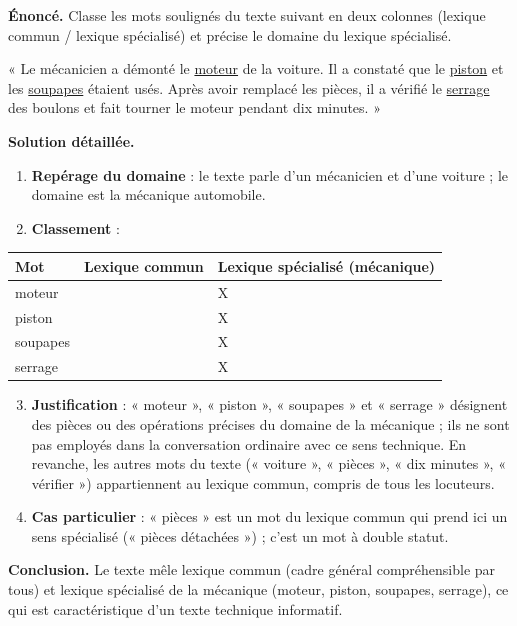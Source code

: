 \documentclass[11pt]{article}
\newcommand{\cle}[1]{{\popxbold\color{popdark}#1}}
\begin{document}
\begin{exoresolu}
\textbf{Énoncé.} Classe les mots soulignés du texte suivant en deux colonnes (lexique commun / lexique spécialisé) et précise le domaine du lexique spécialisé.

« Le mécanicien a démonté le \underline{moteur} de la voiture. Il a constaté que le \underline{piston} et les \underline{soupapes} étaient usés. Après avoir remplacé les pièces, il a vérifié le \underline{serrage} des boulons et fait tourner le moteur pendant dix minutes. »

\tcblower
\textbf{Solution détaillée.}
\begin{enumerate}
\item \textbf{Repérage du domaine} : le texte parle d'un mécanicien et d'une voiture ; le domaine est la \cle{mécanique automobile}.
\item \textbf{Classement} :
\end{enumerate}
\begin{center}
\begin{tabularx}{\linewidth}{|l|X|X|}\hline
\rowcolor{popblueL} \textbf{Mot} & \textbf{Lexique commun} & \textbf{Lexique spécialisé (mécanique)} \\ \hline
moteur & & X \\ \hline
piston & & X \\ \hline
soupapes & & X \\ \hline
serrage & & X \\ \hline
\end{tabularx}
\end{center}
\begin{enumerate}
\setcounter{enumi}{2}
\item \textbf{Justification} : « moteur », « piston », « soupapes » et « serrage » désignent des pièces ou des opérations précises du domaine de la mécanique ; ils ne sont pas employés dans la conversation ordinaire avec ce sens technique. En revanche, les autres mots du texte (« voiture », « pièces », « dix minutes », « vérifier ») appartiennent au lexique commun, compris de tous les locuteurs.
\item \textbf{Cas particulier} : « pièces » est un mot du lexique commun qui prend ici un sens spécialisé (« pièces détachées ») ; c'est un mot à double statut.
\end{enumerate}
\textbf{Conclusion.} Le texte mêle lexique commun (cadre général compréhensible par tous) et lexique spécialisé de la mécanique (moteur, piston, soupapes, serrage), ce qui est caractéristique d'un texte technique informatif.
\end{exoresolu}
\end{document}
